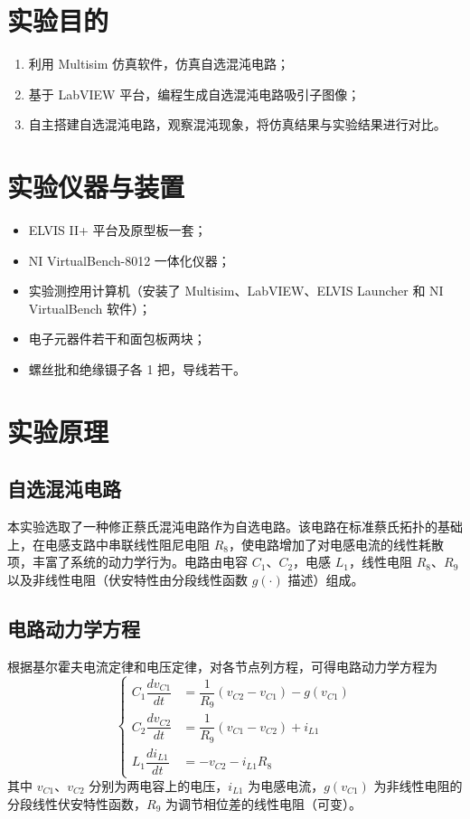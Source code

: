 \documentclass[a4paper,8pt,twocolumn]{article}
\begin{document}
\setcounter{section}{0}

\section{实验目的}

\begin{enumerate}
  \item 利用 Multisim 仿真软件，仿真自选混沌电路；
  \item 基于 LabVIEW 平台，编程生成自选混沌电路吸引子图像；
  \item 自主搭建自选混沌电路，观察混沌现象，将仿真结果与实验结果进行对比。
\end{enumerate}

\section{实验仪器与装置}

\begin{itemize}
  \item ELVIS II+ 平台及原型板一套；
  \item NI VirtualBench-8012 一体化仪器；
  \item 实验测控用计算机（安装了 Multisim、LabVIEW、ELVIS Launcher 和 NI VirtualBench 软件）；
  \item 电子元器件若干和面包板两块；
  \item 螺丝批和绝缘镊子各 1 把，导线若干。
\end{itemize}

\section{实验原理}

\subsection{自选混沌电路}

本实验选取了一种修正蔡氏混沌电路作为自选电路。该电路在标准蔡氏拓扑的基础上，在电感支路中串联线性阻尼电阻 $R_8$，使电路增加了对电感电流的线性耗散项，丰富了系统的动力学行为。电路由电容 $C_1$、$C_2$，电感 $L_1$，线性电阻 $R_8$、$R_9$ 以及非线性电阻（伏安特性由分段线性函数 $g(\cdot)$ 描述）组成。

\subsection{电路动力学方程}

根据基尔霍夫电流定律和电压定律，对各节点列方程，可得电路动力学方程为
\begin{equation}
  \left\{
  \begin{aligned}
    C_1\dfrac{dv_{C1}}{dt} &= \dfrac{1}{R_9}(v_{C2}-v_{C1}) - g(v_{C1})\\[8pt]
    C_2\dfrac{dv_{C2}}{dt} &= \dfrac{1}{R_9}(v_{C1}-v_{C2}) + i_{L1}\\[8pt]
    L_1\dfrac{di_{L1}}{dt} &= -v_{C2} - i_{L1}R_8
  \end{aligned}
  \right.
  \tag{DX2.1}
\end{equation}
其中 $v_{C1}$、$v_{C2}$ 分别为两电容上的电压，$i_{L1}$ 为电感电流，$g(v_{C1})$ 为非线性电阻的分段线性伏安特性函数，$R_9$ 为调节相位差的线性电阻（可变）。
\end{document}
